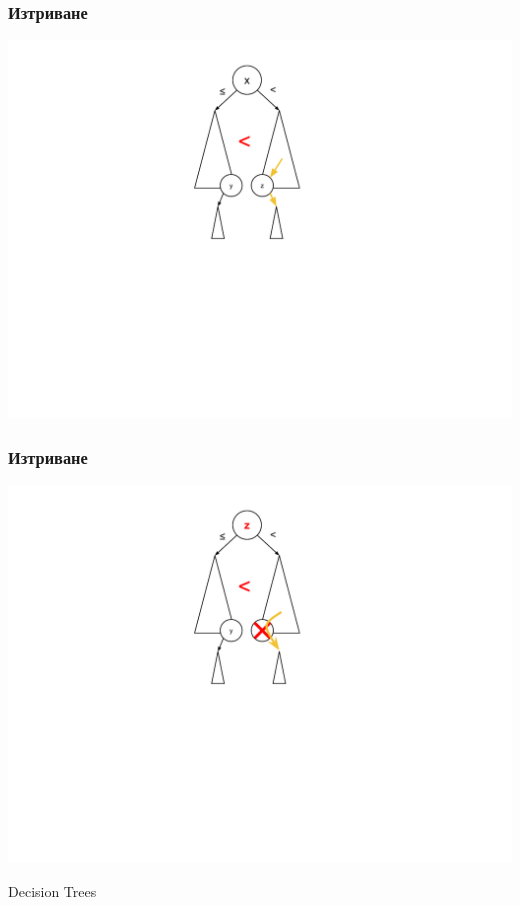 \documentclass{beamer}
\begin{document}
    
  \begin{frame}[fragile]
  \frametitle{Изтриване}
  
  \includegraphics[width=14cm]{images/tree_delete_2}
  
  \end{frame}

  
  \begin{frame}[fragile]
  \frametitle{Изтриване}
  
  \includegraphics[width=14cm]{images/tree_delete_3}
  
  \end{frame}
  

\begin{frame}
  \centerline{Decision Trees}
\end{frame}
\end{document}
